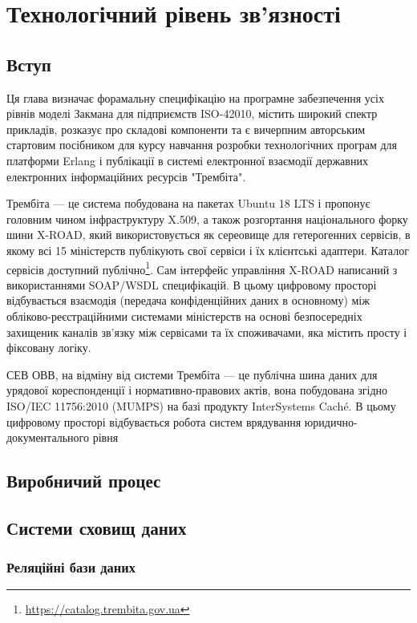 \chapter{Технологічний рівень зв'язності}

\section{Вступ}

Ця глава визначає форамальну специфікацію на програмне забезпечення усіх рівнів моделі Закмана
для підприємств ISO-42010, містить широкий спектр прикладів, розказує про складові компоненти
та є вичерпним авторським стартовим посібником для курсу навчання розробки
технологічних програм для платформи Erlang і публікації в системі електронної взаємодії
державних електронних інформаційних ресурсів "Трембіта".

Трембіта — це система побудована на пакетах Ubuntu 18 LTS і пропонує головним чином
інфраструктуру X.509, а також розгортання національного форку шини X-ROAD,
який використовується як сереовище для гетерогенних сервісів, в якому всі 15 міністерств
публікують свої сервіси і їх клієнтські адаптери. Каталог сервісів доступний
публічно\footnote{\url{https://catalog.trembita.gov.ua}}. Сам інтерфейс управління X-ROAD
написаний з використаннями SOAP/WSDL специфікацій. В цьому цифровому просторі відбувається
взаємодія (передача конфіденційних даних в основному) між обліково-реєстраційними системами
міністерств на основі безпосередніх захищеник каналів зв'язку між сервісами та їх споживачами,
яка містить просту і фіксовану логіку.

СЕВ ОВВ, на відміну від системи Трембіта — це публічна шина даних для
урядової кореспонденції і нормативно-правових актів, вона побудована
згідно ISO/IEC 11756:2010 (MUMPS) на базі продукту InterSystems Caché.
В цьому цифровому просторі відбувається робота систем врядування
юридично-документального рівня

\section{Виробничий процес}

\section{Системи сховищ даних}

\subsection{Реляційні бази даних}

